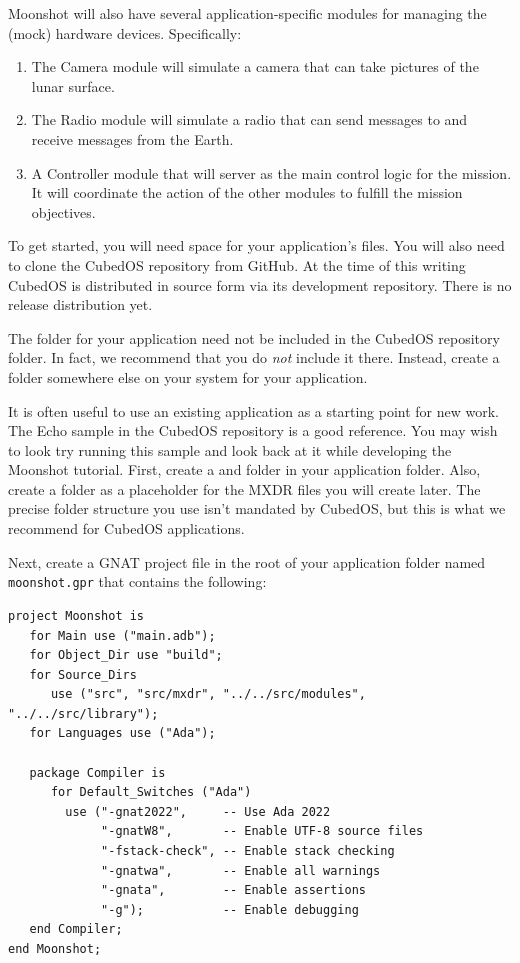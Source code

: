 Moonshot will also have several application-specific modules for managing the (mock) hardware
devices. Specifically:
\begin{enumerate}
  \item The Camera module will simulate a camera that can take pictures of the lunar surface.

  \item The Radio module will simulate a radio that can send messages to and receive messages
  from the Earth.


  \item A Controller module that will server as the main control logic for the mission. It will
  coordinate the action of the other modules to fulfill the mission objectives.
\end{enumerate}

To get started, you will need space for your application's files. You will also need to clone
the CubedOS repository from GitHub. At the time of this writing CubedOS is distributed in source
form via its development repository. There is no release distribution yet.

The folder for your application need not be included in the CubedOS repository folder. In fact,
we recommend that you do \emph{not} include it there. Instead, create a folder somewhere else on
your system for your application.

It is often useful to use an existing application as a starting point for new work. The Echo
sample in the CubedOS repository is a good reference. You may wish to look try running this sample
and look back at it while developing the Moonshot tutorial. First, create a  and
 folder in your application folder. Also, create a folder  as a
placeholder for the MXDR files you will create later. The precise folder structure you use isn't
mandated by CubedOS, but this is what we recommend for CubedOS applications.

Next, create a GNAT project file in the root of your application folder named
\texttt{moonshot.gpr} that contains the following:
\begin{verbatim}
project Moonshot is
   for Main use ("main.adb");
   for Object_Dir use "build";
   for Source_Dirs
      use ("src", "src/mxdr", "../../src/modules", "../../src/library");
   for Languages use ("Ada");

   package Compiler is
      for Default_Switches ("Ada")
        use ("-gnat2022",     -- Use Ada 2022
             "-gnatW8",       -- Enable UTF-8 source files
             "-fstack-check", -- Enable stack checking
             "-gnatwa",       -- Enable all warnings
             "-gnata",        -- Enable assertions
             "-g");           -- Enable debugging
   end Compiler;
end Moonshot;
\end{verbatim}

